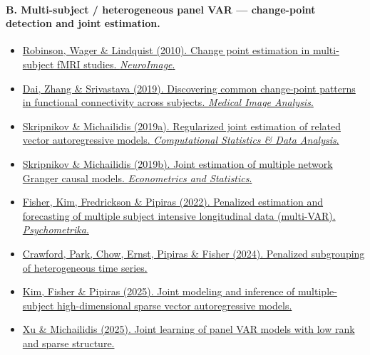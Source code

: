 \documentclass[11pt]{article}
\begin{document}
\paragraph{B. Multi-subject / heterogeneous panel VAR --- change-point detection and joint estimation.}
\begin{itemize}
    \item \href{https://doi.org/10.1016/j.neuroimage.2009.08.061}{Robinson, Wager \& Lindquist (2010). Change point estimation in multi-subject fMRI studies. \emph{NeuroImage}.} \cite{robinson2010change}
    \item \href{https://doi.org/10.1016/j.media.2019.101532}{Dai, Zhang \& Srivastava (2019). Discovering common change-point patterns in functional connectivity across subjects. \emph{Medical Image Analysis}.} \cite{dai2019discovering}
    \item \href{https://doi.org/10.1016/j.csda.2019.05.007}{Skripnikov \& Michailidis (2019a). Regularized joint estimation of related vector autoregressive models. \emph{Computational Statistics \& Data Analysis}.} \cite{skripnikov2019regularized}
    \item \href{https://doi.org/10.1016/j.ecosta.2018.08.001}{Skripnikov \& Michailidis (2019b). Joint estimation of multiple network Granger causal models. \emph{Econometrics and Statistics}.} \cite{skripnikov2019joint}
    \item \href{https://doi.org/10.1007/s11336-021-09825-7}{Fisher, Kim, Fredrickson \& Pipiras (2022). Penalized estimation and forecasting of multiple subject intensive longitudinal data (multi-VAR). \emph{Psychometrika}.} \cite{fisher2022penalized}
    \item \href{https://arxiv.org/abs/2409.03085}{Crawford, Park, Chow, Ernst, Pipiras \& Fisher (2024). Penalized subgrouping of heterogeneous time series.} \cite{crawford2024penalized}
    \item \href{https://arxiv.org/abs/2510.14044}{Kim, Fisher \& Pipiras (2025). Joint modeling and inference of multiple-subject high-dimensional sparse vector autoregressive models.} \cite{kim2025joint}
    \item \href{https://arxiv.org/abs/2509.15402}{Xu \& Michailidis (2025). Joint learning of panel VAR models with low rank and sparse structure.} \cite{xu2025joint}
\end{itemize}
\end{document}
